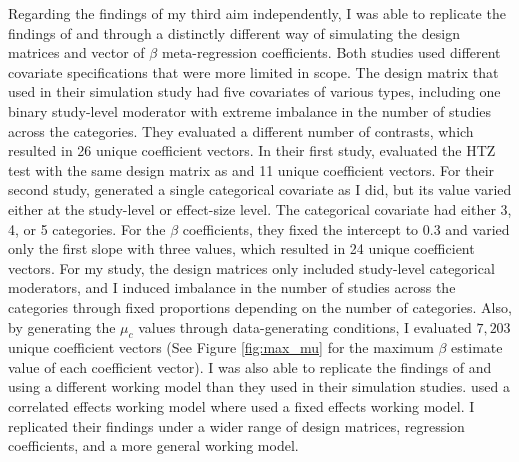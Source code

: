 Regarding the findings of my third aim independently, I was able to replicate the findings of \textcite{joshi_cluster_2022} and \textcite{tipton2015b} through a distinctly different way of simulating the design matrices and vector of $\beta$ meta-regression coefficients. Both studies used different covariate specifications that were more limited in scope. The design matrix that \textcite{tipton2015b} used in their simulation study had five covariates of various types, including one binary study-level moderator with extreme imbalance in the number of studies across the categories. They evaluated a different number of contrasts, which resulted in 26 unique coefficient vectors. In their first study, \textcite{joshi_cluster_2022} evaluated the HTZ test with the same design matrix as \textcite{tipton2015b} and 11 unique coefficient vectors. For their second study, \textcite{joshi_cluster_2022} generated a single categorical covariate as I did, but its value varied either at the study-level or effect-size level. The categorical covariate had either 3, 4, or 5 categories. For the $\beta$ coefficients, they fixed the intercept to 0.3 and varied only the first slope with three values, which resulted in 24 unique coefficient vectors. For my study, the design matrices only included study-level categorical moderators, and I induced imbalance in the number of studies across the categories through fixed proportions depending on the number of categories. Also, by generating the $\mu_c$ values through data-generating conditions, I evaluated $7,203$ unique coefficient vectors (See Figure \ref{fig:max_mu} for the maximum $\beta$ estimate value of each coefficient vector). I was also able to replicate the findings of \textcite{joshi_cluster_2022} and \textcite{tipton2015b} using a different working model than they used in their simulation studies.  \textcite{joshi_cluster_2022} used a correlated effects working model where \textcite{tipton2015b} used a fixed effects working model. I replicated their findings under a wider range of design matrices, regression coefficients, and a more general working model.   




